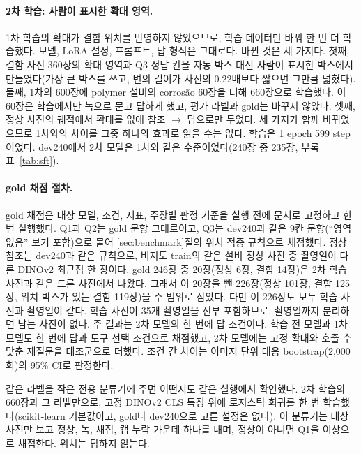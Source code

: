 \documentclass[11pt]{article}
\begin{document}
\paragraph{2차 학습: 사람이 표시한 확대 영역.} 1차 학습의 확대가 결함 위치를 반영하지 않았으므로, 학습 데이터만 바꿔 한 번 더 학습했다. 모델, LoRA 설정, 프롬프트, 답 형식은 그대로다. 바뀐 것은 세 가지다. 첫째, 결함 사진 360장의 확대 영역과 Q3 정답 칸을 자동 박스 대신 사람이 표시한 박스에서 만들었다(가장 큰 박스를 쓰고, 변의 길이가 사진의 0.22배보다 짧으면 그만큼 넓혔다). 둘째, 1차의 600장에 polymer 설비의 corrosão 60장을 더해 660장으로 학습했다. 이 60장은 학습에서만 녹으로 묻고 답하게 했고, 평가 라벨과 gold는 바꾸지 않았다. 셋째, 정상 사진의 궤적에서 확대를 없애 참조 $\rightarrow$ 답으로만 두었다. 세 가지가 함께 바뀌었으므로 1차와의 차이를 그중 하나의 효과로 읽을 수는 없다. 학습은 1 epoch 599 step이었다. dev240에서 2차 모델은 1차와 같은 수준이었다(240장 중 235장, 부록 표~\ref{tab:sft}).

\paragraph{gold 채점 절차.} gold 채점은 대상 모델, 조건, 지표, 주장별 판정 기준을 실행 전에 문서로 고정하고 한 번 실행했다. Q1과 Q2는 gold 문항 그대로이고, Q3는 dev240과 같은 9칸 문항(``영역 없음'' 보기 포함)으로 물어 \ref{sec:benchmark}절의 위치 적중 규칙으로 채점했다. 정상 참조는 dev240과 같은 규칙으로, 비지도 train의 같은 설비 정상 사진 중 촬영일이 다른 DINOv2 최근접 한 장이다. gold 246장 중 20장(정상 6장, 결함 14장)은 2차 학습 사진과 같은 드론 사진에서 나왔다. 그래서 이 20장을 뺀 226장(정상 101장, 결함 125장, 위치 박스가 있는 결함 119장)을 주 범위로 삼았다. 다만 이 226장도 모두 학습 사진과 촬영일이 같다. 학습 사진이 35개 촬영일을 전부 포함하므로, 촬영일까지 분리하면 남는 사진이 없다. 주 결과는 2차 모델의 한 번에 답 조건이다. 학습 전 모델과 1차 모델도 한 번에 답과 도구 선택 조건으로 채점했고, 2차 모델에는 고정 확대와 호출 수 맞춘 재질문을 대조군으로 더했다. 조건 간 차이는 이미지 단위 대응 bootstrap(2,000회)의 95\% CI로 판정한다.

같은 라벨을 작은 전용 분류기에 주면 어떤지도 같은 실행에서 확인했다. 2차 학습의 660장과 그 라벨만으로, 고정 DINOv2 CLS 특징 위에 로지스틱 회귀를 한 번 학습했다(scikit-learn 기본값이고, gold나 dev240으로 고른 설정은 없다). 이 분류기는 대상 사진만 보고 정상, 녹, 새집, 캡 누락 가운데 하나를 내며, 정상이 아니면 Q1을 이상으로 채점한다. 위치는 답하지 않는다.
\end{document}
